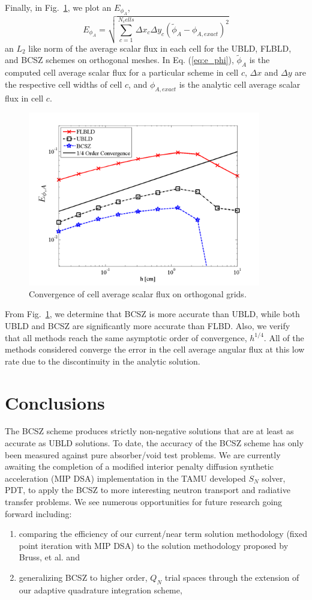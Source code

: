 \documentclass{mc2015}
\newcommand{\fig}[1]{Fig.~\ref{#1}}                      %
\newcommand{\benum}{\begin{equation}} 			%
\newcommand{\eenum}{\end{equation}}
\newcommand{\eqt}[1]{Eq. (\ref{#1})}  %
\begin{document}
Finally, in \fig{fig:convergence}, we plot an $E_{\phi_A}$,
\benum
\label{eq:e_phi}
E_{\phi_A} = \sqrt{ \sum_{c=1}^{N_cells}{ \Delta x_c \Delta y_c (\widetilde{\phi}_A - \phi_{A,exact} )^2} }
\eenum
an $L_2$ like norm of the average scalar flux in each cell for the UBLD, FLBLD, and BCSZ schemes on orthogonal meshes.  
In \eqt{eq:e_phi}, $\widetilde{\phi}_A$ is the computed cell average scalar flux for a particular scheme in cell $c$, $\Delta x$ and $\Delta y$ are the respective cell widths of cell $c$, and $\phi_{A,exact}$ is the analytic cell average scalar flux in cell $c$.
\begin{figure}[h]
\centering
\includegraphics[width=4in]{glance_convergence}
\caption{Convergence of cell average scalar flux on orthogonal grids.}
\label{fig:convergence}
\end{figure}
From \fig{fig:convergence}, we determine that BCSZ is more accurate than UBLD, while both UBLD and BCSZ are significantly more accurate than FLBD.
Also, we verify that all methods reach the same asymptotic order of convergence, $h^{1/4}$.
All of the methods considered converge the error in the cell average angular flux at this low rate due to the discontinuity in the analytic solution.

\section{Conclusions}
\label{sec:conclusions}
The BCSZ scheme produces strictly non-negative solutions that are at least as accurate as UBLD solutions.
To date, the accuracy of the BCSZ scheme has only been measured against pure absorber/void test problems.  
We are currently awaiting the completion of a modified interior penalty  diffusion synthetic acceleration (MIP DSA) implementation\cite{hackemack} in the TAMU developed $S_N$ solver, PDT\cite{pdt}, to apply the BCSZ to more interesting neutron transport and radiative transfer problems.
We see numerous opportunities for future research going forward including:
\begin{enumerate}
\item comparing the efficiency of our current/near term solution methodology (fixed point iteration with MIP DSA) to the solution methodology proposed by Bruss, et al. \cite{csz_don} and
\item generalizing BCSZ to higher order, $Q_N$ trial spaces through the extension of our adaptive quadrature integration scheme,
\end{enumerate}
\end{document}
